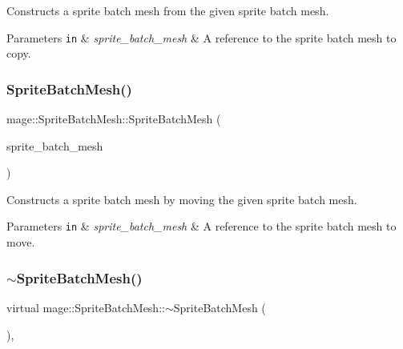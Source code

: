 Constructs a sprite batch mesh from the given sprite batch mesh.


\begin{DoxyParams}[1]{Parameters}
\mbox{\tt in}  & {\em sprite\+\_\+batch\+\_\+mesh} & A reference to the sprite batch mesh to copy. \\
\hline
\end{DoxyParams}
\hypertarget{classmage_1_1_sprite_batch_mesh_abbf8c76740e0f04eaabe5fe0790fe72c}{}\label{classmage_1_1_sprite_batch_mesh_abbf8c76740e0f04eaabe5fe0790fe72c} 
\subsubsection{\texorpdfstring{Sprite\+Batch\+Mesh()}{SpriteBatchMesh()}\hspace{0.1cm}{\footnotesize\ttfamily [3/3]}}
{\footnotesize\ttfamily mage\+::\+Sprite\+Batch\+Mesh\+::\+Sprite\+Batch\+Mesh (\begin{DoxyParamCaption}\item[{\hyperlink{classmage_1_1_sprite_batch_mesh}{Sprite\+Batch\+Mesh} \&\&}]{sprite\+\_\+batch\+\_\+mesh }\end{DoxyParamCaption})\hspace{0.3cm}{\ttfamily [default]}}

Constructs a sprite batch mesh by moving the given sprite batch mesh.


\begin{DoxyParams}[1]{Parameters}
\mbox{\tt in}  & {\em sprite\+\_\+batch\+\_\+mesh} & A reference to the sprite batch mesh to move. \\
\hline
\end{DoxyParams}
\hypertarget{classmage_1_1_sprite_batch_mesh_aad8ae9446fd8f8159bb3531f31130032}{}\label{classmage_1_1_sprite_batch_mesh_aad8ae9446fd8f8159bb3531f31130032} 
\subsubsection{\texorpdfstring{$\sim$\+Sprite\+Batch\+Mesh()}{~SpriteBatchMesh()}}
{\footnotesize\ttfamily virtual mage\+::\+Sprite\+Batch\+Mesh\+::$\sim$\+Sprite\+Batch\+Mesh (\begin{DoxyParamCaption}{ }\end{DoxyParamCaption})\hspace{0.3cm}{\ttfamily [virtual]}, {\ttfamily [default]}}

